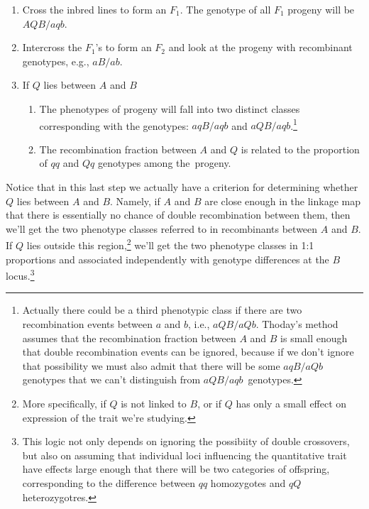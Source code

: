 \documentclass[12pt]{article}
\begin{document}
\begin{enumerate}

\item Cross the inbred lines to form an $F_1$. The genotype of all
$F_1$ progeny will be~$AQB/aqb$.

\item Intercross the $F_1$'s to form an $F_2$ and look at the progeny 
with recombinant genotypes, e.g., $aB/ab$.

\item If $Q$ lies between $A$ and $B$

    \begin{enumerate}

    \item The phenotypes of progeny will fall into two distinct
      classes corresponding with the genotypes: $aqB/aqb$ and
      $aQB/aqb$.\footnote{Actually there could be a third phenotypic
        class if there are two recombination events between $a$ and
        $b$, i.e., $aQB/aQb$. Thoday's method assumes that the
        recombination fraction between $A$ and $B$ is small enough
        that double recombination events can be ignored, because if we
        don't ignore that possibility we must also admit that there
        will be some $aqB/aQb$ genotypes that we can't distinguish
        from $aQB/aqb$~genotypes.}

    \item The recombination fraction between $A$ and $Q$ is related to
    the proportion of $qq$ and $Qq$ genotypes among the~progeny.

    \end{enumerate}

\end{enumerate}

\noindent Notice that in this last step we actually have a criterion
for determining whether $Q$ lies between $A$ and $B$. Namely, if $A$
and $B$ are close enough in the linkage map that there is essentially
no chance of double recombination between them, then we'll get the two
phenotype classes referred to in recombinants between $A$ and $B$. If
$Q$ lies outside this region,\footnote{More specifically, if $Q$ is
  not linked to $B$, or if $Q$ has only a small effect on expression
  of the trait we're studying.} we'll get the two phenotype classes in
1:1 proportions and associated independently with genotype differences
at the $B$ locus.\footnote{This logic not only depends on ignoring the
  possibiity of double crossovers, but also on assuming that
  individual loci influencing the quantitative trait have effects
  large enough that there will be two categories of offspring,
  corresponding to the difference between $qq$ homozygotes and $qQ$
  heterozygotres.} 
\end{document}
